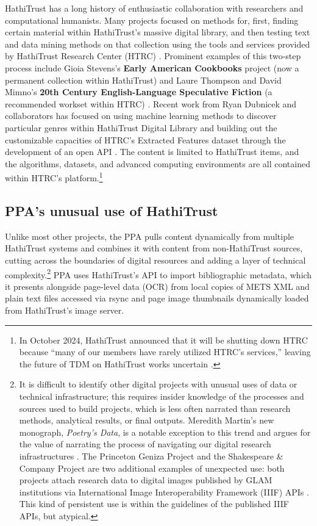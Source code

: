\documentclass[final]{anthology-ch} %
\begin{document}
HathiTrust has a long history of enthusiastic collaboration with researchers and computational humanists. Many projects focused on methods for, first, finding certain material within HathiTrust’s massive digital library, and then testing text and data mining methods on that collection using the tools and services provided by HathiTrust Research Center (HTRC) \cite{noauthor_hathitrust_nodate}. Prominent examples of this two-step process include Gioia Stevens's \textbf{Early American Cookbooks} project (now a permanent collection within HathiTrust) \cite{stevens_new_2017} and Laure Thompson and David Mimno's \textbf{20th Century English-Language Speculative Fiction }(a recommended workset within HTRC) \cite{thompson_building_nodate, 
noauthor_recommended_nodate}. Recent work from Ryan Dubnicek and collaborators has focused on using machine learning methods to discover particular genres within HathiTrust Digital Library \cite{parulian_uncovering_2022, dubnicek_ryan_piloting_2023} and building out the customizable capacities of HTRC’s Extracted Features dataset through the development of an open API \autocite{walsh_library_2023}. The content is limited to HathiTrust items, and the algorithms, datasets, and advanced computing environments are all contained within HTRC’s platform.\footnote{In October 2024, HathiTrust announced that it will be shutting down HTRC because “many of our members have rarely utilized HTRC’s services,” leaving the future of TDM on HathiTrust works uncertain \cite{noauthor_plans_nodate}. }  

\subsection{PPA’s unusual use of HathiTrust}

Unlike most other projects, the PPA pulls content dynamically from multiple HathiTrust systems and combines it with content from non-HathiTrust sources, cutting across the boundaries of digital resources and adding a layer of technical complexity.\footnote{It is difficult to identify other digital projects with unusual uses of data or technical infrastructure; this requires insider knowledge of the processes and sources used to build projects, which is less often narrated than research methods, analytical results, or final outputs. Meredith Martin’s new monograph, \textit{Poetry’s Data}, is a notable exception to this trend and argues for the value of narrating the process of navigating our digital research infrastructures \cite{martin_poetrys_2025}. The Princeton Geniza Project and the Shakespeare \& Company Project are two additional examples of unexpected use: both projects attach research data to digital images published by GLAM institutions via International Image Interoperability Framework (IIIF) APIs \cite{noauthor_princeton_nodate, noauthor_shakespeare_2020}. This kind of persistent use is within the guidelines of the published IIIF APIs, but atypical.}  PPA uses HathiTrust’s API to import bibliographic metadata, which it presents alongside page-level data (OCR) from local copies of METS XML and plain text files accessed via rsync and page image thumbnails dynamically loaded from HathiTrust’s image server.
\end{document}
